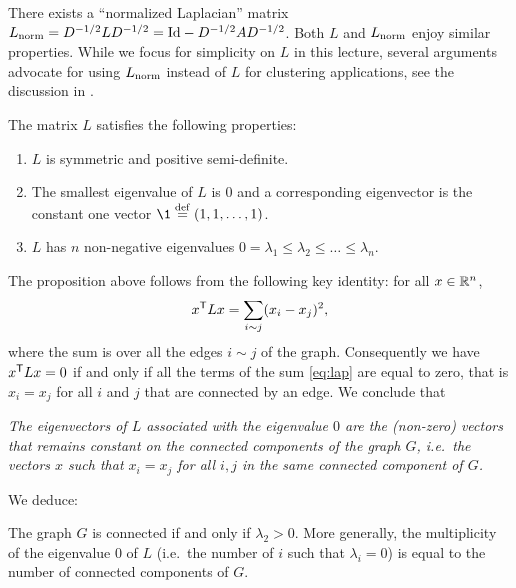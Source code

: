 \documentclass[11pt,nocut]{article}
\begin{document}
\begin{remark}
	There exists a ``normalized Laplacian'' matrix $L_{\rm norm} = D^{-1/2} L D^{-1/2} = {{\rm Id}} - D^{-1/2} A D^{-1/2}$. Both $L$ and $L_{\rm norm}$ enjoy similar properties.
	While we focus for simplicity on $L$ in this lecture, several arguments advocate for using $L_{\rm norm}$ instead of $L$ for clustering applications, see the discussion in \cite[Section~8.4]{von2007tutorial}.
\end{remark}

\begin{proposition}
	The matrix $L$ satisfies the following properties:
	\begin{enumerate}
		\item $L$ is symmetric and positive semi-definite.
		\item The smallest eigenvalue of $L$ is $0$ and a corresponding eigenvector is the constant one vector $\1 \defeq (1,1, \dots, 1)$.
		\item $L$ has $n$ non-negative eigenvalues $0 = \lambda_1 \leq \lambda_2 \leq \dots \leq \lambda_n$.
	\end{enumerate}
\end{proposition}

The proposition above follows from the following key identity: for all $x \in \mathbb{R}^n$,
\begin{equation}\label{eq:lap}
x^{{\sf T}} L x = \sum_{i \sim j} (x_i - x_j)^2,
\end{equation}
where the sum is over all the edges $i \sim j$ of the graph.
Consequently we have $x^{{\sf T}} L x = 0$ if and only if all the terms of the sum \eqref{eq:lap} are equal to zero, that is $x_i = x_j$ for all $i$ and $j$ that are connected by an edge. We conclude that
\begin{center}
	\emph{
	The eigenvectors of $L$ associated with the eigenvalue $0$ are the (non-zero) vectors that remains constant on the connected components of the graph $G$, i.e.\ the vectors $x$ such that $x_i = x_j$ for all $i,j$ in the same connected component of $G$.}
\end{center}

We deduce:
\begin{proposition}\label{prop:lambda2}
	The graph $G$ is connected if and only if $\lambda_2 > 0$.
More generally, the multiplicity of the eigenvalue $0$ of $L$ (i.e.\ the number of $i$ such that $\lambda_i = 0$) is equal to the number of connected components of $G$.
\end{proposition}
\end{document}
